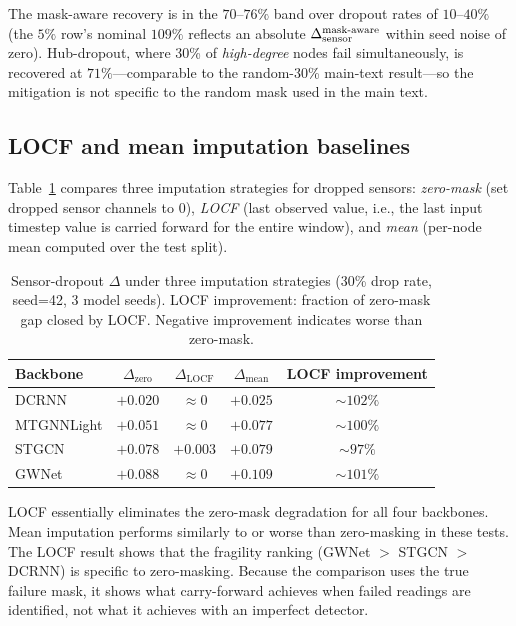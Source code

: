 The mask-aware recovery is in the $70$--$76\%$ band over dropout rates of $10$--$40\%$
(the $5\%$ row's nominal $109\%$ reflects an absolute $\Delta_{\text{sensor}}^{\text{mask-aware}}$
within seed noise of zero). Hub-dropout, where 30\% of \emph{high-degree}
nodes fail simultaneously, is recovered at $71\%$---comparable to the
random-30\% main-text result---so the mitigation is not specific to the
random mask used in the main text.

\subsection{LOCF and mean imputation baselines}
\label{sec:appendix_imputation}

Table~\ref{tab:imputation} compares three imputation strategies for dropped sensors:
\emph{zero-mask} (set dropped sensor channels to 0), \emph{LOCF} (last observed value,
i.e., the last input timestep value is carried forward for the entire window), and
\emph{mean} (per-node mean computed over the test split).

\begin{table}[h]
\centering
\caption{Sensor-dropout $\Delta$ under three imputation strategies (30\% drop rate, seed=42, 3 model seeds). LOCF improvement: fraction of zero-mask gap closed by LOCF. Negative improvement indicates worse than zero-mask.}
\label{tab:imputation}
\vskip 0.1in
\small
\begin{tabular}{lcccc}
\toprule
\textbf{Backbone} & \textbf{$\Delta_{\text{zero}}$} & \textbf{$\Delta_{\text{LOCF}}$} & \textbf{$\Delta_{\text{mean}}$} & \textbf{LOCF improvement} \\
\midrule
DCRNN      & $+0.020$ & $\approx 0$ & $+0.025$ & $\sim 102\%$ \\
MTGNNLight & $+0.051$ & $\approx 0$ & $+0.077$ & $\sim 100\%$ \\
STGCN      & $+0.078$ & $+0.003$   & $+0.079$ & $\sim 97\%$ \\
GWNet      & $+0.088$ & $\approx 0$ & $+0.109$ & $\sim 101\%$ \\
\bottomrule
\end{tabular}
\end{table}

LOCF essentially eliminates the zero-mask degradation for all four backbones.
Mean imputation performs similarly to or worse than zero-masking in these tests.
The LOCF result shows that the fragility ranking (GWNet $>$ STGCN $>$ DCRNN)
is specific to zero-masking. Because the comparison uses the true failure mask,
it shows what carry-forward achieves when failed readings are identified,
not what it achieves with an imperfect detector.

